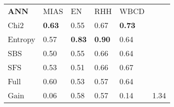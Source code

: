 \begin{tabular}{|l|l|l|l|l|l}
\cline{1-5}
        \textbf{ANN} & MIAS              & EN                & RHH               & WBCD      &         \\
\cline{1-5}
Chi2    & \textbf{0.63}  & 0.55           & 0.67           & \textbf{0.73}  &         \\
Entropy & 0.57           & \textbf{0.83}  & \textbf{0.90}  & 0.64           &         \\
SBS     & 0.50           & 0.55           & 0.66           & 0.64           &         \\
SFS     & 0.53           & 0.51           & 0.66           & 0.67           &         \\
Full    & 0.60           & 0.53           & 0.57           & 0.64 \\
\cline{1-5}
\cline{1-5}
Gain    & 0.06           & 0.58           & 0.57           & 0.14           & 1.34 \\
\cline{1-5}
\end{tabular}

